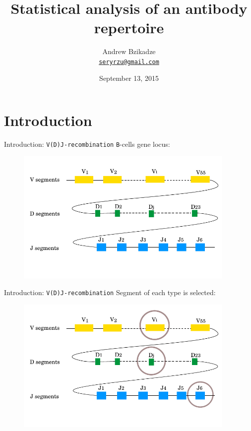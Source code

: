 \documentclass{beamer}\usepackage[]{graphicx}\usepackage[]{color}
\title{Statistical analysis of an antibody repertoire}
\author [Andrew Bzikadze]{Andrew Bzikadze\\ \texttt{\small{\href{mailto:seryrzu@gmail.com}{seryrzu@gmail.com}}}}
\date {
September 13, 2015
}
\begin{document}
\begin{frame}
  \titlepage
\end{frame}

\section{Introduction}

\begin{frame}{Introduction: \texttt{V(D)J-recombination}}
  \texttt{B}-cells gene locus:
  \begin{figure}[h]
    \center\includegraphics[width=300pt]{Pictures/vdj1.pdf}
 \end{figure}
\end{frame}

\begin{frame}{Introduction: \texttt{V(D)J-recombination}}
  Segment of each type is selected: 
  \begin{figure}[h]
    \center\includegraphics[width=300pt]{Pictures/vdj2_select_genes.pdf}
 \end{figure}
\end{frame}
\end{document}
